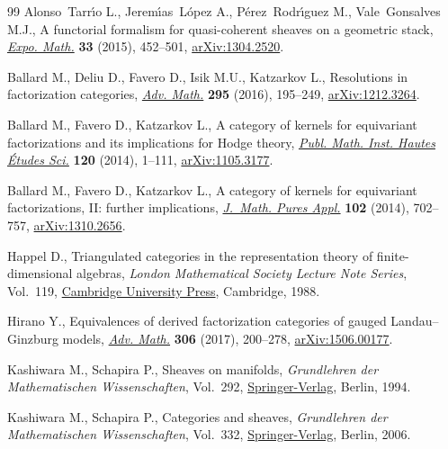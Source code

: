 \documentclass[11pt]{article}
\numberwithin{equation}{section}
\numberwithin{equation}{section}
\begin{document}
\begin{thebibliography}{99}
Alonso~Tarr\'{\i}o L., Jerem\'{\i}as~L\'opez A., P\'erez~Rodr\'{\i}guez M.,
 Vale~Gonsalves M.J., A functorial formalism for quasi-coherent sheaves on a
 geometric stack, \href{https://doi.org/10.1016/j.exmath.2014.12.007}{\textit{Expo. Math.}} \textbf{33} (2015), 452--501,
 \href{https://arxiv.org/abs/1304.2520}{arXiv:1304.2520}.


Ballard M., Deliu D., Favero D., Isik M.U., Katzarkov L., Resolutions in
 factorization categories, \href{https://doi.org/10.1016/j.aim.2016.02.008}{\textit{Adv. Math.}} \textbf{295} (2016), 195--249,
 \href{https://arxiv.org/abs/1212.3264}{arXiv:1212.3264}.

Ballard M., Favero D., Katzarkov L., A category of kernels for equivariant
 factorizations and its implications for {H}odge theory, \href{https://doi.org/10.1007/s10240-013-0059-9}{\textit{Publ. Math.
 Inst. Hautes \'Etudes Sci.}} \textbf{120} (2014), 1--111,
 \href{https://arxiv.org/abs/1105.3177}{arXiv:1105.3177}.

Ballard M., Favero D., Katzarkov L., A category of kernels for equivariant
 factorizations, {II}: further implications, \href{https://doi.org/10.1016/j.matpur.2014.02.004}{\textit{J.~Math. Pures Appl.}}
 \textbf{102} (2014), 702--757, \href{https://arxiv.org/abs/1310.2656}{arXiv:1310.2656}.

Happel D., Triangulated categories in the representation theory of
 finite-dimensional algebras, \textit{London Ma\-the\-matical Society Lecture Note
 Series}, Vol.~119, \href{https://doi.org/10.1017/CBO9780511629228}{Cambridge University Press}, Cambridge, 1988.

Hirano Y., Equivalences of derived factorization categories of gauged
 {L}andau--{G}inzburg models, \href{https://doi.org/10.1016/j.aim.2016.10.023}{\textit{Adv. Math.}} \textbf{306} (2017),
 200--278, \href{https://arxiv.org/abs/1506.00177}{arXiv:1506.00177}.

Kashiwara M., Schapira P., Sheaves on manifolds, \textit{Grundlehren der
 Mathematischen Wissenschaften}, Vol.~292, \href{https://doi.org/10.1007/978-3-662-02661-8}{Springer-Verlag}, Berlin, 1994.

Kashiwara M., Schapira P., Categories and sheaves, \textit{Grundlehren der
 Mathematischen Wissenschaften}, Vol.~332, \href{https://doi.org/10.1007/3-540-27950-4}{Springer-Verlag}, Berlin, 2006.


\end{thebibliography}
\end{document}
